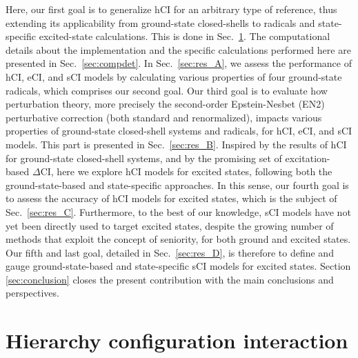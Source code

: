 \documentclass[aip,jcp,reprint,noshowkeys,superscriptaddress]{revtex4-1}
\begin{document}
Here, our first goal is to generalize hCI for an arbitrary type of reference, thus extending its applicability from ground-state closed-shells \cite{Kossoski_2022}
to radicals and state-specific excited-state calculations.
This is done in Sec.~\ref{sec:hCI}.
The computational details about the implementation and the specific calculations performed here are presented in Sec.~\ref{sec:compdet}.
In Sec.~\ref{sec:res_A}, we assess the performance of hCI, eCI, and sCI models by calculating various properties of four ground-state radicals, which comprises our second goal.
Our third goal is to evaluate how perturbation theory, more precisely the second-order Epstein-Nesbet (EN2) perturbative correction (both standard and renormalized), \cite{Garniron_2019}
impacts various properties of ground-state closed-shell systems and radicals, for hCI, eCI, and sCI models.
This part is presented in Sec.~\ref{sec:res_B}.
Inspired by the results of hCI for ground-state closed-shell systems, \cite{Kossoski_2022}
and by the promising set of excitation-based $\Delta$CI, \cite{Kossoski_2023} here we explore hCI models for excited states, following both the ground-state-based and state-specific approaches.
In this sense, our fourth goal is to assess the accuracy of hCI models for excited states, which is the subject of Sec.~\ref{sec:res_C}.
Furthermore, to the best of our knowledge, sCI models have not yet been directly used to target excited states,
despite the growing number of methods that exploit the concept of seniority,
for both ground
\cite{Limacher_2013,Limacher_2014,Tecmer_2014,Boguslawski_2014a,Boguslawski_2015,Boguslawski_2014b,Boguslawski_2014c,Johnson_2020,Henderson_2014,Stein_2014,Henderson_2015,Chen_2015,Bytautas_2018,Marie_2021,Boguslawski_2021,Tecmer_2022,Mamache_2023,Fecteau_2022}
and excited states.
\cite{Boguslawski_2016b,Boguslawski_2016c,Boguslawski_2019,Nowak_2019,Kossoski_2021,Marie_2021,Tecmer_2022,Rishi_2023,Nowak_2023,Fecteau_2022}
Our fifth and last goal, detailed in Sec.~\ref{sec:res_D}, is therefore to define and gauge ground-state-based and state-specific sCI models for excited states.
Section \ref{sec:conclusion} closes the present contribution with the main conclusions and perspectives.

\section{Hierarchy configuration interaction}
\label{sec:hCI}
\end{document}
